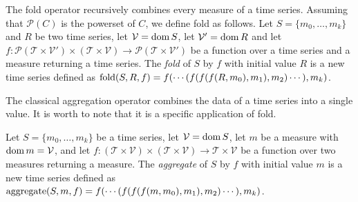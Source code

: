 The fold operator recursively combines every measure of a time
series. Assuming that $\mathcal{P}(C)$ is the powerset of $C$, we
define fold as follows.
%
Let $S=\{m_0,\dots, m_k\}$ and $R$ be two time series, let
$\mathcal{V}=\operatorname{dom} S$, let $\mathcal{V'}=\operatorname{dom} R$ and let 
%
$f:\mathcal{P}(\mathcal{T}\times\mathcal{V'}) \times (\mathcal{T}\times\mathcal{V}) \rightarrow \mathcal{P}(\mathcal{T}\times\mathcal{V'})$ 
%
be a function over a time series and a measure returning a time
series.
%
The \emph{fold} of $S$ by $f$ with initial value $R$ is a new time
series defined as $\operatorname*{fold}(S,R,f) = f(\cdots(f(f(f(R,m_0),\allowbreak
m_1),\allowbreak m_2)\cdots),\allowbreak m_k)$.
%


The classical aggregation operator combines the data of a time series
into a single value.  It is worth to note that it is a specific
application of fold.

Let $S=\{m_0,\dots,m_k\}$ be a time series, let $\mathcal{V}=\operatorname{dom} S$,
let $m$ be a measure with $\operatorname{dom} m=\mathcal{V}$, and let 
%
$f:(\mathcal{T}\times\mathcal{V})\times(\mathcal{T}\times\mathcal{V})\rightarrow \mathcal{T}\times\mathcal{V}$ 
%
be a function over two measures returning a measure. The
\emph{aggregate} of $S$ by $f$ with initial value $m$ is a new time
series defined as $\operatorname*{aggregate}(S,m,f) = f(\cdots(f(f(f(m,m_0),\allowbreak
m_1),\allowbreak m_2)\cdots),\allowbreak m_k)$.  





